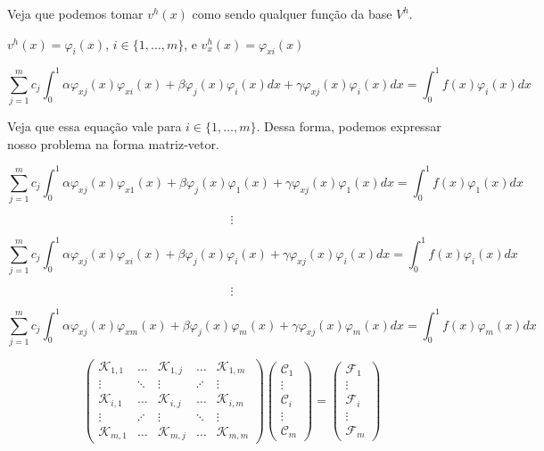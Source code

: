 \begin{frame}
  Veja que podemos tomar $v^h(x)$ como sendo qualquer função da base $V^h$.

  $v^h(x) = \varphi_i(x)$, $i \in \{1,\dots,m\}$, e $v^h_x(x) = \varphi_{xi}(x)$

  \vspace{0.3cm}

  \[\sum_{j=1}^{m} c_j \int_{0}^{1} \alpha \varphi_{xj}(x) \varphi_{xi}(x) + \beta \varphi_j(x) \varphi_i(x)dx + \gamma \varphi_{xj}(x) \varphi_i(x)dx = \int_{0}^{1} f(x) \varphi_i(x)dx\]

  \vspace{0.3cm}

  Veja que essa equação vale para $i \in \{1,\dots,m\}$. Dessa forma, podemos expressar nosso problema na forma matriz-vetor.
\end{frame}

\begin{frame}
  \[\displaystyle\sum_{j=1}^{m} c_j \int_{0}^{1}\alpha \varphi_{xj}(x) \varphi_{x1}(x) + \beta \varphi_j(x) \varphi_1(x) + \gamma \varphi_{xj}(x) \varphi_1(x)dx = \int_{0}^{1} f(x) \varphi_1(x)dx\]

  \[\vdots\]

  \[\displaystyle\sum_{j=1}^{m} c_j \int_{0}^{1} \alpha \varphi_{xj}(x) \varphi_{xi}(x)  + \beta \varphi_j(x) \varphi_i(x) + \gamma \varphi_{xj}(x) \varphi_i(x)dx = \int_{0}^{1} f(x) \varphi_i(x)dx\]

  \[\vdots\]

  \[\displaystyle\sum_{j=1}^{m} c_j \int_{0}^{1} \alpha \varphi_{xj}(x) \varphi_{xm}(x) + \beta \varphi_j(x) \varphi_m(x) + \gamma \varphi_{xj}(x) \varphi_m(x)dx = \int_{0}^{1} f(x) \varphi_m(x)dx\]
\end{frame}

\begin{frame}
\[
\begin{pmatrix}
  \mathcal{K}_{1,1} & \dots & \mathcal{K}_{1,j} & \dots & \mathcal{K}_{1,m} \\
  \vdots & \ddots & \vdots & \iddots & \vdots \\
  \mathcal{K}_{i,1} & \dots & \mathcal{K}_{i,j} & \dots & \mathcal{K}_{i,m} \\
  \vdots & \iddots & \vdots & \ddots & \vdots \\
  \mathcal{K}_{m,1} & \dots & \mathcal{K}_{m,j} & \dots & \mathcal{K}_{m,m}
\end{pmatrix}
\begin{pmatrix}
  \mathcal{C}_1 \\ \vdots \\ \mathcal{C}_i \\ \vdots \\ \mathcal{C}_m
\end{pmatrix}
=
\begin{pmatrix}
  \mathcal{F}_1 \\ \vdots \\ \mathcal{F}_i \\ \vdots \\ \mathcal{F}_m
\end{pmatrix}
\]
\end{frame}

